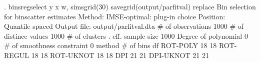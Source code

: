 . binsregselect y x w, simsgrid(30) savegrid(output/parfitval) replace
{\smallskip}
Bin selection for binscatter estimates
Method: IMSE-optimal: plug-in choice
Position: Quantile-spaced
Output file: output/parfitval.dta
{\smallskip}
          \# of observations {\VBAR}    1000
       \# of distince values {\VBAR}    1000
              \# of clusters {\VBAR}       .
           eff. sample size {\VBAR}    1000
       Degree of polynomial {\VBAR}       0
 \# of smoothness constraint {\VBAR}       0
{\smallskip}
    method    {\VBAR}   \# of bins {\VBAR}     df   
   ROT-POLY   {\VBAR}      18     {\VBAR}     18
   ROT-REGUL  {\VBAR}      18     {\VBAR}     18
   ROT-UKNOT  {\VBAR}      18     {\VBAR}     18
      DPI     {\VBAR}      21     {\VBAR}     21
   DPI-UKNOT  {\VBAR}      21     {\VBAR}     21
